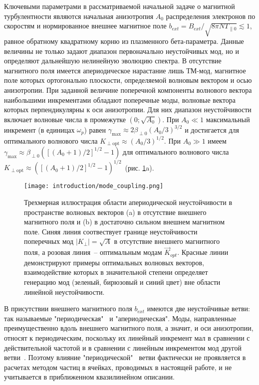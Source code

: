 Ключевыми параметрами в рассматриваемой начальной задаче о магнитной турбулентности являются начальная анизотропия $A_0$ распределения электронов по скоростям и нормированное внешнее магнитное поле $b_{ext}=B_{ext}/\sqrt{8\pi N T_{\|0}}\lesssim1$, равное обратному квадратному корню из плазменного бета-параметра. Данные величины не только задают диапазон первоначально неустойчивых мод, но и определяют дальнейшую нелинейную эволюцию спектра. В отсутствие магнитного поля имеется  апериодическое нарастание лишь ТМ-мод,  магнитное поле которых ортогонально плоскости, определяемой волновым вектором и осью анизотропии. При заданной величине поперечной компоненты волнового вектора наибольшими инкрементами обладают поперечные моды, волновые вектора которых перпендикулярны к оси анизотропии. Для них диапазон неустойчивости включает волновые числа в промежутке $\left(0;\sqrt{A_0}\right)$.\cite{??} При $A_0\ll1$ максимальный инкремент (в единицах $\omega_p$) равен $\gamma_\mathrm{max}\approx 2 \beta_{\perp0} (A_0 / 3)^{3/2}$ и достигается для оптимального волнового числа $K_\mathrm{\perp opt} \approx (A_0 / 3)^{1/2}$. При $A_0 \gg 1$ имеем $\gamma_\mathrm{max} \approx \beta_{\perp0} \left( \left[ (A_0+1)/2 \right]^{1/2} - 1 \right)$ для оптимального волнового числа $K_\mathrm{\perp opt} \approx \left( \left[ (A_0+1)/2 \right]^{1/2} - 1 \right)^{1/2}$~(рис. \ref{ris:mode_coupling}a).
\begin{figure}[h]

\texttt{[image: introduction/mode\_coupling.png]}
\caption{Трехмерная иллюстрация области апериодической неустойчивости в пространстве волновых векторов (a) в отсутствие внешнего магнитного поля и (b) в достаточно сильном внешнем магнитном поле. Синяя линия соотвествует границе неустойчивости поперечных мод $|K_\perp|=\sqrt{A}$ в отсутствие внешнего магнитного поля, а розовая линия~-- оптимальным модам $\overrightarrow{K}_{opt}$. Красные линии демонстрируют примеры оптимальных волновых векторов, взаимодействие которых в значительной степени определяет генерацию мод (зеленый, бирюзовый и синий цвет) вне области линейной неустойчивости.
}
\label{ris:mode_coupling}
\end{figure}

В присутствии внешнего магнитного поля $b_{ext}$ имеются две неустойчивые ветви: так называемые "периодическая"~ и "апериодическая"\cite{???}. Моды, направленные преимущественно вдоль внешнего магнитного поля, а значит, и оси анизотропии, относят к периодическим, поскольку их линейный инкремент мал в сравнении с действительной частотой и в сравнении с линейным инкрементом мод другой ветви~\cite{Li2000}. Поэтому влияние "периодической"~ ветви фактически не проявляется в расчетах методом частиц в ячейках, проводимых в настоящей работе, и не учитывается в приближенном квазилинейном описании.

